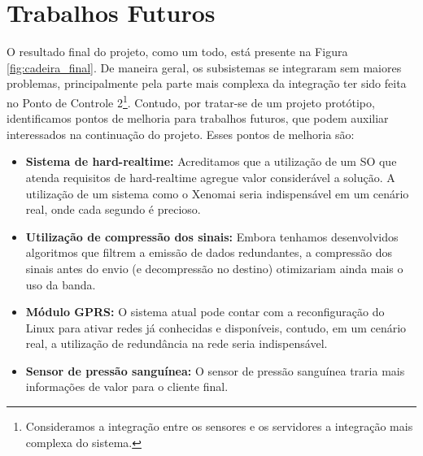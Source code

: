 \chapter{Trabalhos Futuros}
\label{chapter:futuro}

O resultado final do projeto, como um todo, está presente na Figura
\ref{fig:cadeira_final}. De maneira geral, os subsistemas se integraram sem
maiores problemas, principalmente pela parte mais complexa da integração
ter sido feita no Ponto de Controle 2\footnote{Consideramos a integração entre
os sensores e os servidores a integração mais complexa do sistema.}. Contudo,
por tratar-se de um projeto protótipo, identificamos pontos de melhoria para
trabalhos futuros, que podem auxiliar interessados na continuação do projeto.
Esses pontos de melhoria são:
\begin{itemize}
    \item \textbf{Sistema de hard-realtime:} Acreditamos que a utilização de um
        SO que atenda requisitos de hard-realtime agregue valor considerável a
        solução. A utilização de um sistema como o Xenomai seria indispensável
        em um cenário real, onde cada segundo é precioso.
    \item \textbf{Utilização de compressão dos sinais:} Embora tenhamos
        desenvolvidos algoritmos que filtrem a emissão de dados redundantes,
        a compressão dos sinais antes do envio (e decompressão no destino)
        otimizariam ainda mais o uso da banda.
    \item \textbf{Módulo GPRS:} O sistema atual pode contar com a reconfiguração
        do Linux para ativar redes já conhecidas e disponíveis, contudo, em um
        cenário real, a utilização de redundância na rede seria indispensável.
    \item \textbf{Sensor de pressão sanguínea:} O sensor de pressão sanguínea
        traria mais informações de valor para o cliente final.
\end{itemize}
